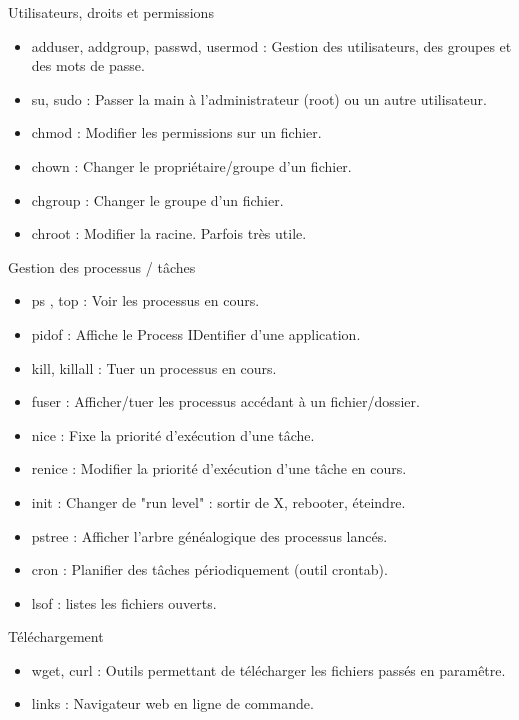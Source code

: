 \documentclass[10pt]{beamer}
\begin{document}
\begin{frame}{Utilisateurs, droits et permissions}
\begin{itemize}
\item \alert{adduser}, \alert{addgroup}, \alert{passwd}, \alert{usermod} : Gestion des utilisateurs, des groupes et des mots de passe.
\item \alert{su}, \alert{sudo} : Passer la main à l'administrateur (root) ou un autre utilisateur.
\item \alert{chmod} : Modifier les permissions sur un fichier.
\item \alert{chown} : Changer le propriétaire/groupe d'un fichier.
\item \alert{chgroup} : Changer le groupe d'un fichier.
\item \alert{chroot} : Modifier la racine. Parfois très utile.
\end{itemize}
\end{frame}

\begin{frame}{Gestion des processus / tâches}
\begin{itemize}
\item \alert{ps} , \alert{top} : Voir les processus en cours.
\item \alert{pidof} : Affiche le Process IDentifier d'une application.
\item \alert{kill}, \alert{killall} : Tuer un processus en cours.
\item \alert{fuser} : Afficher/tuer les processus accédant à un fichier/dossier.
\item \alert{nice} : Fixe la priorité d'exécution d'une tâche.
\item \alert{renice} : Modifier la priorité d'exécution d'une tâche en cours.
\item \alert{init} : Changer de "run level" : sortir de X, rebooter, éteindre.
\item \alert{pstree} : Afficher l'arbre généalogique des processus lancés.
\item \alert{cron} : Planifier des tâches périodiquement (outil crontab).
\item \alert{lsof} : listes les fichiers ouverts.
\end{itemize}
\end{frame}

\begin{frame}{Téléchargement}
\begin{itemize}
\item \alert{wget}, \alert{curl} : Outils permettant de télécharger les fichiers passés en paramêtre.
\item \alert{links} :\alert{ Navigateur} web en ligne de commande.
\end{itemize}
\end{frame}
\end{document}

